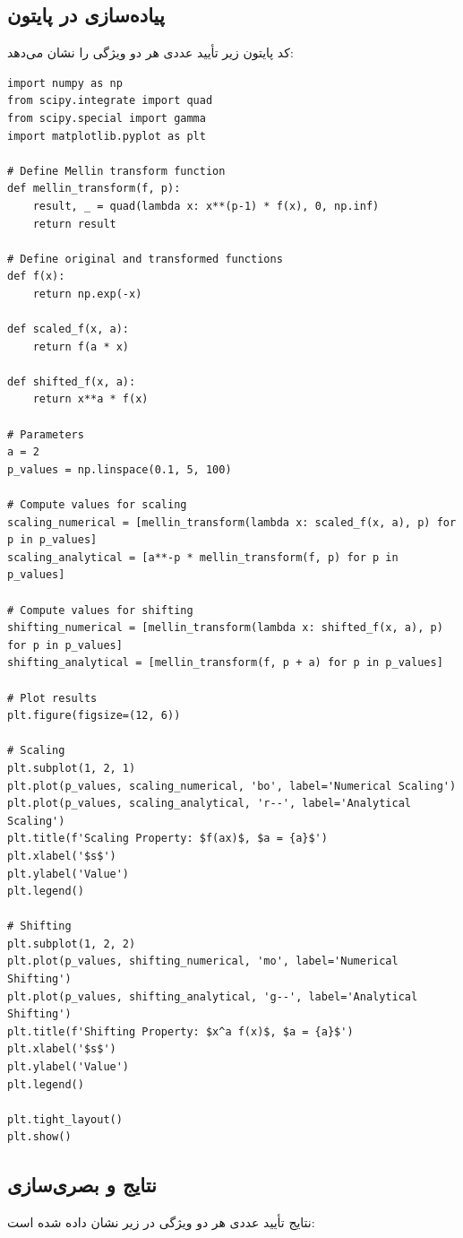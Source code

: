 \documentclass[12pt,a4paper]{article}
\begin{document}
\subsection{پیاده‌سازی در پایتون}
کد پایتون زیر تأیید عددی هر دو ویژگی را نشان می‌دهد:
\begin{verbatim}
import numpy as np
from scipy.integrate import quad
from scipy.special import gamma
import matplotlib.pyplot as plt

# Define Mellin transform function
def mellin_transform(f, p):
    result, _ = quad(lambda x: x**(p-1) * f(x), 0, np.inf)
    return result

# Define original and transformed functions
def f(x):
    return np.exp(-x)

def scaled_f(x, a):
    return f(a * x)

def shifted_f(x, a):
    return x**a * f(x)

# Parameters
a = 2
p_values = np.linspace(0.1, 5, 100)

# Compute values for scaling
scaling_numerical = [mellin_transform(lambda x: scaled_f(x, a), p) for p in p_values]
scaling_analytical = [a**-p * mellin_transform(f, p) for p in p_values]

# Compute values for shifting
shifting_numerical = [mellin_transform(lambda x: shifted_f(x, a), p) for p in p_values]
shifting_analytical = [mellin_transform(f, p + a) for p in p_values]

# Plot results
plt.figure(figsize=(12, 6))

# Scaling
plt.subplot(1, 2, 1)
plt.plot(p_values, scaling_numerical, 'bo', label='Numerical Scaling')
plt.plot(p_values, scaling_analytical, 'r--', label='Analytical Scaling')
plt.title(f'Scaling Property: $f(ax)$, $a = {a}$')
plt.xlabel('$s$')
plt.ylabel('Value')
plt.legend()

# Shifting
plt.subplot(1, 2, 2)
plt.plot(p_values, shifting_numerical, 'mo', label='Numerical Shifting')
plt.plot(p_values, shifting_analytical, 'g--', label='Analytical Shifting')
plt.title(f'Shifting Property: $x^a f(x)$, $a = {a}$')
plt.xlabel('$s$')
plt.ylabel('Value')
plt.legend()

plt.tight_layout()
plt.show()
\end{verbatim}

\subsection{نتایج و بصری‌سازی}
نتایج تأیید عددی هر دو ویژگی در زیر نشان داده شده است:
\end{document}
